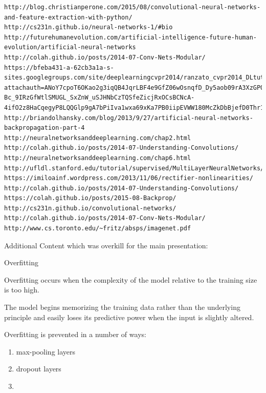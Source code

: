 \documentclass[12pt]{beamer}
\begin{document}
\begin{frame}[fragile]
\footnotesize
\begin{verbatim}
http://blog.christianperone.com/2015/08/convolutional-neural-networks-and-feature-extraction-with-python/
http://cs231n.github.io/neural-networks-1/#bio
http://futurehumanevolution.com/artificial-intelligence-future-human-evolution/artificial-neural-networks
http://colah.github.io/posts/2014-07-Conv-Nets-Modular/
https://bfeba431-a-62cb3a1a-s-sites.googlegroups.com/site/deeplearningcvpr2014/ranzato_cvpr2014_DLtutorial.pdf?attachauth=ANoY7cpoT6OKao2g3iqQB4JqrLBF4e9GfZ06wOsnqfD_Dy5aob09rA3XzGPQSysUphYafHjkncEfoJPPyab19s4v8tfQS65Xk57NWieQOFC1zrYR2O_0gUN1Bsb64TS6kucrQP2prHjwwO4-Bc_9IRzGfWtlSMUGL_SxZnW_uSJHNbCzTQSfeZicjRxOCsBCNcA-4ifO2z8HaCqegyP8LQQGlp9gA7bPiIva1wxa69xKa7PB0iipEVWW180McZkDbBjefD0Thr13&attredirects=0
http://briandolhansky.com/blog/2013/9/27/artificial-neural-networks-backpropagation-part-4
http://neuralnetworksanddeeplearning.com/chap2.html
http://colah.github.io/posts/2014-07-Understanding-Convolutions/
http://neuralnetworksanddeeplearning.com/chap6.html
http://ufldl.stanford.edu/tutorial/supervised/MultiLayerNeuralNetworks/
https://imiloainf.wordpress.com/2013/11/06/rectifier-nonlinearities/
http://colah.github.io/posts/2014-07-Understanding-Convolutions/
https://colah.github.io/posts/2015-08-Backprop/
http://cs231n.github.io/convolutional-networks/
http://colah.github.io/posts/2014-07-Conv-Nets-Modular/
http://www.cs.toronto.edu/~fritz/absps/imagenet.pdf
\end{verbatim}
\end{frame}
\begin{frame}

\end{frame}
\begin{frame}
Additional Content which was overkill for the main presentation:
\end{frame}
\begin{frame} {Overfitting}

Overfitting occurs when the complexity of the model relative to the training size is too high.


The model begins memorizing the training data rather  than the underlying principle and easily loses its predictive power when the input is slightly altered.

Overfitting is prevented in a number of ways:

\begin{enumerate}

\item max-pooling layers
\item dropout layers
\item

\end{enumerate}

\end{frame}
\end{document}
